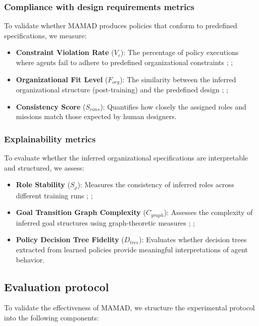 \documentclass[pdflatex,sn-mathphys-num]{sn-jnl}%
\theoremstyle{thmstyleone}%
\theoremstyle{thmstyletwo}%
\theoremstyle{thmstylethree}%
\begin{document}
\subsubsection{Compliance with design requirements metrics}
To validate whether MAMAD produces policies that conform to predefined specifications, we measure:
\begin{itemize}
    \item \textbf{Constraint Violation Rate} ($V_c$): The percentage of policy executions where agents fail to adhere to predefined organizational constraints ; ;
    \item \textbf{Organizational Fit Level} ($F_{org}$): The similarity between the inferred organizational structure (post-training) and the predefined design ; ;
    \item \textbf{Consistency Score} ($S_{cons}$): Quantifies how closely the assigned roles and missions match those expected by human designers.
\end{itemize}

\subsubsection{Explainability metrics}
To evaluate whether the inferred organizational specifications are interpretable and structured, we assess:
\begin{itemize}
    \item \textbf{Role Stability} ($S_{\rho}$): Measures the consistency of inferred roles across different training runs ; ;
    \item \textbf{Goal Transition Graph Complexity} ($C_{graph}$): Assesses the complexity of inferred goal structures using graph-theoretic measures ; ;
    \item \textbf{Policy Decision Tree Fidelity} ($D_{tree}$): Evaluates whether decision trees extracted from learned policies provide meaningful interpretations of agent behavior.
\end{itemize}

\subsection{Evaluation protocol}

To validate the effectiveness of MAMAD, we structure the experimental protocol into the following components:
\end{document}
